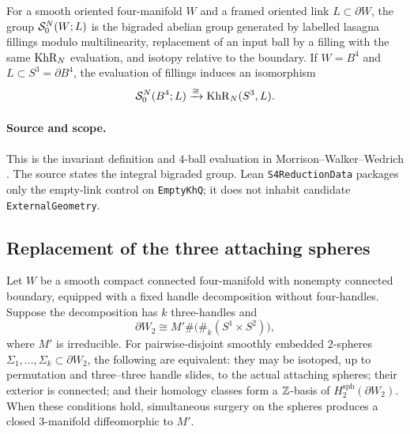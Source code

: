 \begin{externalresult}\label{prop:mww-B4}
For a smooth oriented four-manifold $W$ and a framed oriented link
$L\subset\partial W$, the group $\mathcal{S}^{N}_{0}(W;L)$ is the bigraded abelian group
generated by labelled lasagna fillings modulo multilinearity, replacement of
an input ball by a filling with the same $\operatorname{KhR}_N$ evaluation, and isotopy
relative to the boundary.  If $W=B^4$ and $L\subset S^3=\partial B^4$, the
evaluation of fillings induces an isomorphism
\begin{equation}\label{eq:B4-evaluation}
\mathcal{S}^{N}_{0}(B^4;L)\xrightarrow{\cong}\operatorname{KhR}_N(S^3,L).
\end{equation}
\end{externalresult}

\paragraph{Source and scope.}
This is the invariant definition and $4$-ball evaluation in
Morrison--Walker--Wedrich
\cite[Definition~5.4 and Example~5.6]{MorrisonWalkerWedrich2019}.
The source states the integral bigraded group.  Lean
\texttt{S4ReductionData} packages only the empty-link control on
\texttt{EmptyKhQ}; it does not inhabit candidate \texttt{ExternalGeometry}.

\subsection{Replacement of the three attaching spheres}

\begin{externalresult}\label{prop:hj-theorem53}
Let $W$ be a smooth compact connected four-manifold with nonempty connected
boundary, equipped with a fixed handle decomposition without four-handles.
Suppose the decomposition has $k$ three-handles and
\[
 \partial W_2\cong M'\#\bigl(\#_k(S^1\times S^2)\bigr),
\]
where $M'$ is irreducible.  For pairwise-disjoint smoothly embedded
$2$-spheres $\Sigma_1,\ldots,\Sigma_k\subset\partial W_2$, the following are
equivalent: they may be isotoped, up to permutation and three--three handle
slides, to the actual attaching spheres; their exterior is connected; and
their homology classes form a $\mathbb{Z}$-basis of
$H_2^{\mathrm{sph}}(\partial W_2)$.  When these conditions hold, simultaneous
surgery on the spheres produces a closed $3$-manifold diffeomorphic to $M'$.
\end{externalresult}

